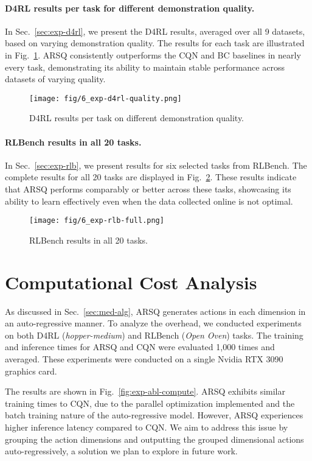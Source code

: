 \paragraph{D4RL results per task for different demonstration quality.}
In Sec.~\ref{sec:exp-d4rl}, we present the D4RL results, averaged over all 9 datasets, based on varying demonstration quality. 
The results for each task are illustrated in Fig.~\ref{fig:exp-d4rl-quality}. 
ARSQ consistently outperforms the CQN and BC baselines in nearly every task, demonstrating its ability to maintain stable performance across datasets of varying quality.

\begin{figure}[h]
    \centering
    \texttt{[image: fig/6\_exp-d4rl-quality.png]}
    \caption{D4RL results per task on different demonstration quality.}
    \label{fig:exp-d4rl-quality}
\end{figure}

\paragraph{RLBench results in all 20 tasks.}
In Sec.~\ref{sec:exp-rlb}, we present results for six selected tasks from RLBench. 
The complete results for all 20 tasks are displayed in Fig.~\ref{fig:exp-rlb-task-all}. 
These results indicate that ARSQ performs comparably or better across these tasks, showcasing its ability to learn effectively even when the data collected online is not optimal.

\begin{figure}[h]
    \centering
    \texttt{[image: fig/6\_exp-rlb-full.png]}
    \caption{RLBench results in all 20 tasks.}
    \label{fig:exp-rlb-task-all}
\end{figure}



\section{Computational Cost Analysis}
As discussed in Sec.~\ref{sec:med-alg}, ARSQ generates actions in each dimension in an auto-regressive manner. 
To analyze the overhead, we conducted experiments on both D4RL (\textit{hopper-medium}) and RLBench (\textit{Open Oven}) tasks. The training and inference times for ARSQ and CQN were evaluated 1,000 times and averaged. 
These experiments were conducted on a single Nvidia RTX 3090 graphics card.

The results are shown in Fig.~\ref{fig:exp-abl-compute}. 
ARSQ exhibits similar training times to CQN, due to the parallel optimization implemented and the batch training nature of the auto-regressive model. 
However, ARSQ experiences higher inference latency compared to CQN. 
We aim to address this issue by grouping the action dimensions and outputting the grouped dimensional actions auto-regressively, a solution we plan to explore in future work.

